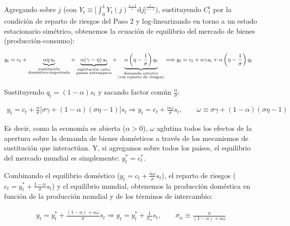 \documentclass[10pt,a4paper]{article}
\begin{document}
Agregando sobre $j$ (con $Y_t\equiv\big[\int_0^1Y_t(j)^{\frac{\varepsilon-1}{\varepsilon}}\mathrm dj\big]^{\frac{\varepsilon}{\varepsilon-1}}$), sustituyendo $C_t^i$ por la condición de reparto de riesgos del Paso 2 y log-linearizando en torno a un estado estacionario simétrico, obtenemos la ecuación de equilibrio del mercado de bienes (producción-consumo):

$$\begin{aligned}
    &y_t=c_t+\underbrace{\alpha\eta\,s_t}_{\substack{\text{\scriptsize sustitución}\\\text{\scriptsize doméstico-importado}}}+\underbrace{\alpha(\gamma-\eta)\,s_t}_{\substack{\text{\scriptsize sustitución entre}\\\text{\scriptsize países extranjeros}}}+\underbrace{\alpha\left(\eta-\frac{1}{\sigma}\right)q_t}_{\substack{\text{\scriptsize demanda exterior}\\\text{\scriptsize (vía reparto de riesgos)}}}\Longrightarrow y_t=c_t+\alpha\gamma s_t+\alpha\left(\eta-\frac{1}{\sigma}\right)q_t
\end{aligned}$$

Sustituyendo $q_t=(1-\alpha)s_t$ y sacando factor común $\frac{\alpha}{\sigma}$:

$$\begin{aligned}
    y_t=c_t+\frac{\alpha}{\sigma}\big[\sigma\gamma+(1-\alpha)(\sigma\eta-1)\big]s_t\Longrightarrow\boxed{y_t=c_t+\frac{\alpha\omega}{\sigma}s_t},\qquad \omega\equiv\sigma\gamma+(1-\alpha)(\sigma\eta-1)
\end{aligned}$$

Es decir, como la economía es abierta ($\alpha>0$), $\omega$ aglutina todos los efectos de la apertura sobre la demanda de bienes domésticos a través de los mecanismos de sustitución que interactúan. Y, si agregamos sobre todos los países, el equilibrio del mercado mundial es simplemente: $y_t^*=c_t^*$.

Combinando el equilibrio doméstico ($y_t=c_t+\frac{\alpha\omega}{\sigma}s_t$), el reparto de riesgos ($c_t=y_t^*+\frac{1-\alpha}{\sigma}s_t$) y el equilibrio mundial, obtenemos la producción doméstica en función de la producción mundial y de los términos de intercambio:

$$\begin{aligned}
    y_t=y_t^*+\frac{(1-\alpha)+\alpha\omega}{\sigma}s_t\Longrightarrow\boxed{y_t=y_t^*+\frac{1}{\sigma_\alpha}s_t},\qquad \sigma_\alpha\equiv\frac{\sigma}{(1-\alpha)+\alpha\omega}
\end{aligned}$$
\end{document}
